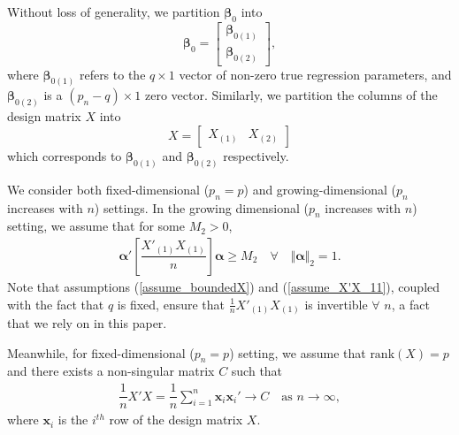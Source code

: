 \documentclass[ejs,authoryear,linksfromyear]{imsart}
\newcommand{\sumin}{\sum_{i=1}^n} %
\numberwithin{equation}{section}
\theoremstyle{plain}
\begin{document}
Without loss of generality, we  partition $\bm{\beta}_0$ into 
\[
\bm{\beta}_0 = 
\begin{bmatrix}
\bm{\beta}_{0(1)} \\
\bm{\beta}_{0(2)}
\end{bmatrix}
,
\]
where $\bm{\beta}_{0(1)}$ refers to the $q \times 1$ vector of non-zero true regression parameters, and $\bm{\beta}_{0(2)}$ is a $(p_n-q) \times 1$ zero vector. Similarly, we  partition the columns of the design matrix $X$ into  
\[
X = 
\begin{bmatrix}
X_{(1)} & X_{(2)}
\end{bmatrix}
\]
which corresponds to $\bm{\beta}_{0(1)}$ and $\bm{\beta}_{0(2)}$ respectively. 

We consider both fixed-dimensional ($p_n = p$) and growing-dimensional ($p_n$ increases with $n$) settings. In the growing dimensional ($p_n$ increases with $n$) setting, we assume that for some $M_2 >0$, 
\begin{align} \label{assume_X'X_11}
\bm{\alpha}' 
\left[ \dfrac{X'_{(1)} X_{(1)}}{n} \right]
\bm{\alpha}
\geq M_2
\quad
\forall
\quad
\Vert \bm{\alpha} \Vert_2 = 1.
\end{align}
Note that assumptions (\ref{assume_boundedX}) and (\ref{assume_X'X_11}), coupled with the fact that $q$ is fixed, ensure that $\frac{1}{n} X'_{(1)} X_{(1)}$ is invertible $\forall$ $n$, a fact that we rely on in this paper.

Meanwhile, for fixed-dimensional ($p_n = p$) setting, we assume that $\text{rank}(X) = p$ and there exists a non-singular matrix $C$ such that
\begin{align} \label{assume_X'X}
\dfrac{1}{n} X'X = \dfrac{1}{n} \sumin \bm{x}_i \bm{x}_i' \to C 
\quad \text{as } n \to \infty,
\end{align} 
\noindent where $\bm{x}_i$ is the $i^{th}$ row of the design matrix $X$. \\ 
\end{document}
